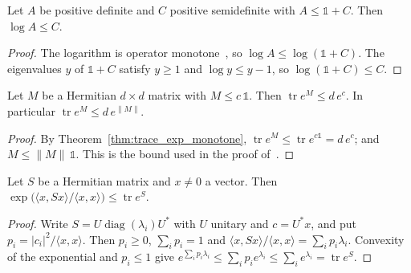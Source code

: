 \begin{theorem}
    \label{thm:log_le_of_le_one_add}
    \leanok
    Let $A$ be positive definite and $C$ positive semidefinite with
    $A\le\mathbb{1}+C$. Then $\log A\le C$.
\end{theorem}
\begin{proof}\leanok
    The logarithm is operator monotone~\cite[Equation~(2.8)]{Tropp2012User}, so
    $\log A\le\log(\mathbb{1}+C)$. The eigenvalues $y$ of $\mathbb{1}+C$ satisfy
    $y\ge1$ and $\log y\le y-1$, so $\log(\mathbb{1}+C)\le C$.
\end{proof}

\begin{theorem}
    \label{thm:trace_exp_dimension_bound}
    \leanok
    Let $M$ be a Hermitian $d\times d$ matrix with $M\le c\,\mathbb{1}$. Then
    $\operatorname{tr}e^{M}\le d\,e^{c}$. In particular
    $\operatorname{tr}e^{M}\le d\,e^{\|M\|}$.
\end{theorem}
\begin{proof}\leanok
    By Theorem~\ref{thm:trace_exp_monotone},
    $\operatorname{tr}e^{M}\le\operatorname{tr}e^{c\mathbb{1}}=d\,e^{c}$; and
    $M\le\|M\|\,\mathbb{1}$. This is the bound used in the proof
    of~\cite[Corollary~3.7]{Tropp2012User}.
\end{proof}

\begin{theorem}
    \label{thm:rayleigh_trace_exp}
    \leanok
    Let $S$ be a Hermitian matrix and $x\neq0$ a vector. Then
    $\exp\bigl(\langle x,Sx\rangle/\langle x,x\rangle\bigr)\le\operatorname{tr}e^{S}$.
\end{theorem}
\begin{proof}\leanok
    Write $S=U\operatorname{diag}(\lambda_i)U^{*}$ with $U$ unitary and
    $c=U^{*}x$, and put $p_i=|c_i|^{2}/\langle x,x\rangle$. Then $p_i\ge0$,
    $\sum_ip_i=1$ and $\langle x,Sx\rangle/\langle x,x\rangle=\sum_ip_i\lambda_i$.
    Convexity of the exponential and $p_i\le1$ give
    $e^{\sum_ip_i\lambda_i}\le\sum_ip_ie^{\lambda_i}\le\sum_ie^{\lambda_i}
        =\operatorname{tr}e^{S}$.
\end{proof}


